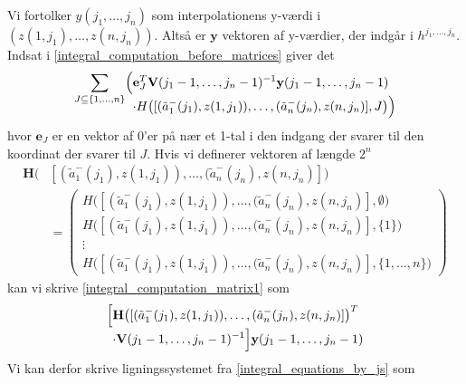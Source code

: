 \documentclass[a4paper, 12pt]{memoir}
\begin{document}
Vi fortolker $y(j_1, \dots, j_n)$ som interpolationens y-værdi i $(z(1,j_1), \dots, z(n,j_n))$. Altså er $\mathbf {y}$ vektoren af y-værdier, der indgår i $h^{j_1, \dots, j_n}$. Indsat i \eqref{integral_computation_before_matrices} giver det
\begin{equation}
\sum_{J\subseteq\{1, \dots, n\}}\Bigl( \begin{lgathered}[t]\mathbf{e}_J^T \mathbf{V}(j_1-1, \dots, j_n-1)^{-1} \mathbf{y}(j_1-1, \dots, j_n-1)\\
\cdot H\bigl([(\tilde a_1^-(j_1), z(1,j_1)), \dots, (\tilde a_n^-(j_n), z(n,j_n)], J\bigr)\Bigr)\end{lgathered}\label{integral_computation_matrix1}
\end{equation}
hvor $\mathbf{e}_J$ er en vektor af 0'er på nær et 1-tal i den indgang der svarer til den koordinat der svarer til $J$. Hvis vi definerer vektoren af længde $2^n$ 
\begin{align}
\mathbf{H}\bigl(&[(\tilde a_1^-(j_1), z(1,j_1)), \dots, (\tilde a_n^-(j_n), z(n,j_n)]\bigr)\\
&=\begin{pmatrix}
H\bigl([(\tilde a_1^-(j_1), z(1,j_1)), \dots, (\tilde a_n^-(j_n), z(n,j_n)], \emptyset \bigr)\\
H\bigl([(\tilde a_1^-(j_1), z(1,j_1)), \dots, (\tilde a_n^-(j_n), z(n,j_n)], \{1\} \bigr)\\
\vdots \\
H\bigl([(\tilde a_1^-(j_1), z(1,j_1)), \dots, (\tilde a_n^-(j_n), z(n,j_n)], \{1, \dots, n\} \bigr)
\end{pmatrix}
\end{align}
kan vi skrive \eqref{integral_computation_matrix1} som
\begin{equation}
\Bigl[\begin{lgathered}[t] \mathbf{H}\bigl([(\tilde a_1^-(j_1), z(1,j_1)), \dots, (\tilde a_n^-(j_n), z(n,j_n)]\bigr)^T\\
\cdot \mathbf{V}(j_1-1, \dots, j_n-1)^{-1} \Bigr] \mathbf{y}(j_1-1, \dots, j_n-1) \end{lgathered}\label{integral_computation_matrix2}
\end{equation}
Vi kan derfor skrive ligningssystemet fra \eqref{integral_equations_by_js} som
\end{document}
